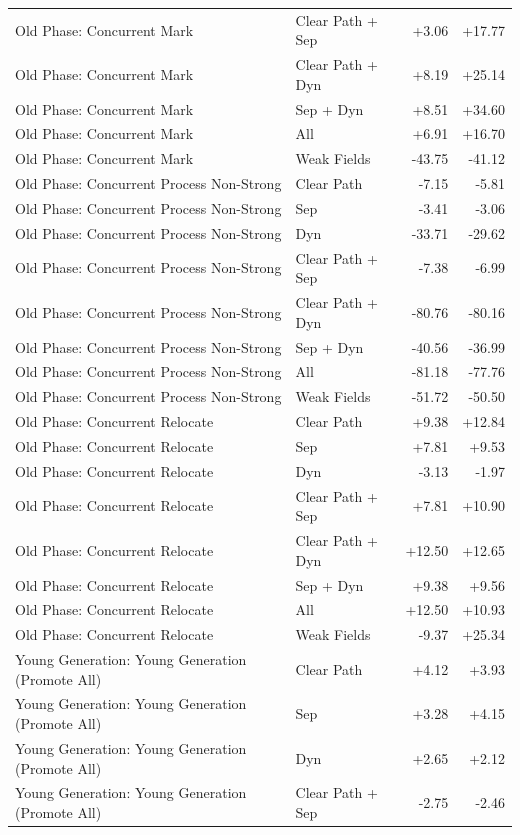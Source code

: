 \begin{table}[t]
\begin{tabular}{llrr}
Old Phase: Concurrent Mark & Clear Path + Sep & +3.06 & +17.77 \\
Old Phase: Concurrent Mark & Clear Path + Dyn & +8.19 & +25.14 \\
Old Phase: Concurrent Mark & Sep + Dyn & +8.51 & +34.60 \\
Old Phase: Concurrent Mark & All & +6.91 & +16.70 \\
Old Phase: Concurrent Mark & Weak Fields & -43.75 & -41.12 \\
Old Phase: Concurrent Process Non-Strong & Clear Path & -7.15 & -5.81 \\
Old Phase: Concurrent Process Non-Strong & Sep & -3.41 & -3.06 \\
Old Phase: Concurrent Process Non-Strong & Dyn & -33.71 & -29.62 \\
Old Phase: Concurrent Process Non-Strong & Clear Path + Sep & -7.38 & -6.99 \\
Old Phase: Concurrent Process Non-Strong & Clear Path + Dyn & -80.76 & -80.16 \\
Old Phase: Concurrent Process Non-Strong & Sep + Dyn & -40.56 & -36.99 \\
Old Phase: Concurrent Process Non-Strong & All & -81.18 & -77.76 \\
Old Phase: Concurrent Process Non-Strong & Weak Fields & -51.72 & -50.50 \\
Old Phase: Concurrent Relocate & Clear Path & +9.38 & +12.84 \\
Old Phase: Concurrent Relocate & Sep & +7.81 & +9.53 \\
Old Phase: Concurrent Relocate & Dyn & -3.13 & -1.97 \\
Old Phase: Concurrent Relocate & Clear Path + Sep & +7.81 & +10.90 \\
Old Phase: Concurrent Relocate & Clear Path + Dyn & +12.50 & +12.65 \\
Old Phase: Concurrent Relocate & Sep + Dyn & +9.38 & +9.56 \\
Old Phase: Concurrent Relocate & All & +12.50 & +10.93 \\
Old Phase: Concurrent Relocate & Weak Fields & -9.37 & +25.34 \\
Young Generation: Young Generation (Promote All) & Clear Path & +4.12 & +3.93 \\
Young Generation: Young Generation (Promote All) & Sep & +3.28 & +4.15 \\
Young Generation: Young Generation (Promote All) & Dyn & +2.65 & +2.12 \\
Young Generation: Young Generation (Promote All) & Clear Path + Sep & -2.75 & -2.46 \\

\end{tabular}
\end{table}
